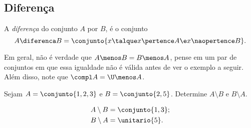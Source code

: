 \subsection{Diferença}

\begin{definition}
	\label{def:setminus}
	A \emph{diferença} do conjunto $A$ por $B$, é o conjunto
	\[
		A \diferenca B = \conjunto{ x \talque  x \pertence A \e x \naopertence B}.
	\]
\end{definition}

\begin{remark}
	Em geral, não é verdade que $A \menos B = B \menos A$, pense em um par de conjuntos em que essa igualdade não é válida antes de ver o exemplo a seguir. Além disso, note que $\compl A = \U \menos A$.
\end{remark}

\begin{example}
	Sejam $A = \conjunto{1, 2, 3}$ e $ B = \conjunto{2,5}$. Determine $A \setminus B$ e $B \setminus A$.
\end{example}
	
\begin{solution}
	\begin{align*}
		&A \setminus B = \conjunto{1,3};\\
		&B \setminus A = \unitario{5}.
	\end{align*}
\end{solution}